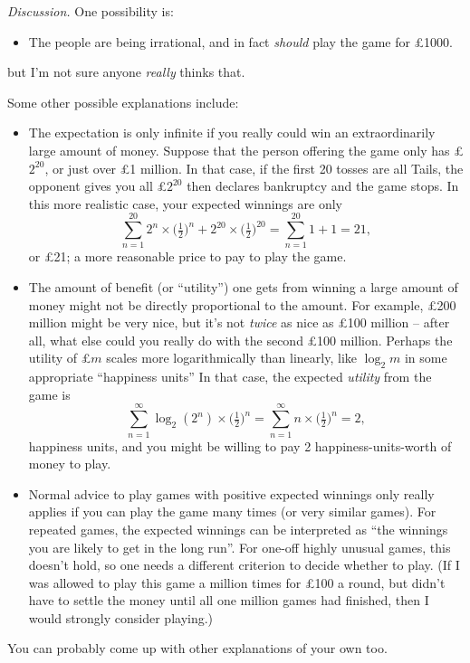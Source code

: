 \documentclass[
  a4paper,
]{book}
\providecommand{\tightlist}{%
  \setlength{\itemsep}{0pt}\setlength{\parskip}{0pt}}
\theoremstyle{definition}
\theoremstyle{definition}
\theoremstyle{definition}
\theoremstyle{definition}
\theoremstyle{remark}
\begin{document}
\begin{myanswers}
\emph{Discussion.}
One possibility is:

\begin{itemize}
\tightlist
\item
  The people are being irrational, and in fact \emph{should} play the game for £1000.
\end{itemize}

but I'm not sure anyone \emph{really} thinks that.

Some other possible explanations include:

\begin{itemize}
\tightlist
\item
  The expectation is only infinite if you really could win an extraordinarily large amount of money. Suppose that the person offering the game only has £\(2^{20}\), or just over £1 million. In that case, if the first 20 tosses are all Tails, the opponent gives you all £\(2^{20}\) then declares bankruptcy and the game stops. In this more realistic case, your expected winnings are only
  \[  \sum_{n=1}^{20} 2^n \times \big(\tfrac12\big)^n + 2^{20} \times \big(\tfrac12\big)^{20} = \sum_{n=1}^{20} 1 + 1 = 21 , \]
  or £21; a more reasonable price to pay to play the game.
\item
  The amount of benefit (or ``utility'') one gets from winning a large amount of money might not be directly proportional to the amount. For example, £200 million might be very nice, but it's not \emph{twice} as nice as £100 million -- after all, what else could you really do with the second £100 million. Perhaps the utility of £\(m\) scales more logarithmically than linearly, like \(\log_2 m\) in some appropriate ``happiness units'' In that case, the expected \emph{utility} from the game is
  \[ \sum_{n=1}^\infty \log_2(2^n) \times \big(\tfrac12\big)^n = \sum_{n=1}^\infty n \times \big(\tfrac12\big)^n = 2 , \]
  happiness units, and you might be willing to pay 2 happiness-units-worth of money to play.
\item
  Normal advice to play games with positive expected winnings only really applies if you can play the game many times (or very similar games). For repeated games, the expected winnings can be interpreted as ``the winnings you are likely to get in the long run''. For one-off highly unusual games, this doesn't hold, so one needs a different criterion to decide whether to play. (If I was allowed to play this game a million times for £100 a round, but didn't have to settle the money until all one million games had finished, then I would strongly consider playing.)
\end{itemize}

You can probably come up with other explanations of your own too.

\end{myanswers}
\end{document}
